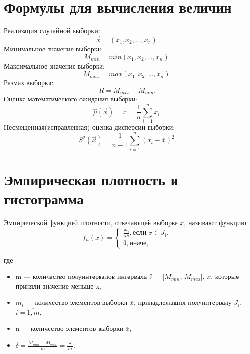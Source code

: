 \documentclass[a4paper, 14pt, unknownkeysallowed]{extreport}
\begin{document}
\section{Формулы для вычисления величин}
Реализация случайной выборки:
\begin{equation}
	\label{x}
	\overrightarrow{x} = (x_1, x_2,\dots,x_n).
\end{equation}
Минимальное значение выборки:
\begin{equation}
	\label{min}
	M_{min} = min(x_1, x_2,\dots,x_n).
\end{equation}
Максимальное значение выборки:
\begin{equation}
	\label{max}
	M_{max} = max(x_1, x_2,\dots,x_n).
\end{equation}
Размах выборки:
\begin{equation}
	\label{r}
	R = M_{max} - M_{min}.
\end{equation}
Оценка математического ожидания выборки:
\begin{equation}
	\label{mu}
	\hat{\mu}(\overrightarrow{x}) = \overline{x} = \frac{1}{n}\sum_{i=1}^{n}x_i.
\end{equation}
Несмещенная(исправленная) оценка дисперсии выборки:
\begin{equation}
	\label{s2}
	S^2(\overrightarrow{x}) = \frac{1}{n-1}\sum_{i=1}^{n}{(x_i - \overline{x})^2}.
\end{equation}

\section{Эмпирическая плотность и гистограмма}
\begin{definition}
	Эмпирической функцией плотности, отвечающей выборке  $\overline{x}$, называют функцию
	\begin{equation}
		f_{n} (x) = \begin{cases}
			\frac{m_i}{n\delta}, \text{если $x\in J_i$},\\
			0, \text{иначе},
		\end{cases}
	\end{equation}
\end{definition}
	где 
	\begin{itemize}
		\item m --- количество полуинтервалов интервала J = [$M_{min}$, $M_{max}$], $\overline{x}$, которые приняли значение меньше x,
		\item $m_i$ --- количество элементов выборки  $\overline{x}$, принадлежащих полуинтервалу $J_i$, $i=\overline{1,m}$,
		\item n --- количество элементов выборки  $\overline{x}$,
		\item $\delta = \frac{M_{min} - M_{max}}{m} = \frac{|J|}{m}$.
	\end{itemize}
\end{document}
